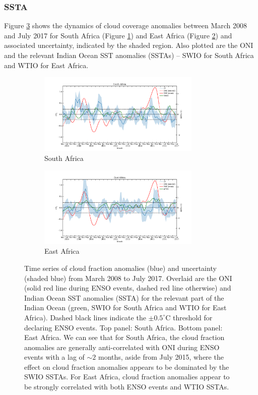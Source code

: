 \subsubsection{SSTA}
Figure \ref{fig:cf_temporal} shows the dynamics of cloud coverage
anomalies between March 2008 and July 2017 for South Africa (Figure
\ref{fig:cf_t_south}) and East Africa (Figure \ref{fig:cf_t_east}) and
associated uncertainty, indicated by the shaded region. Also plotted
are the ONI and the relevant Indian Ocean SST anomalies (SSTAs) -- SWIO
for South Africa and WTIO for East Africa.
\begin{figure}
  \centering
  \begin{subfigure}{\textwidth}
    \centering
    \includegraphics[width=0.85\textwidth]{figures/cf_oni_io_capetown_5window_median}
    \caption{South Africa}
    \label{fig:cf_t_south}
  \end{subfigure}
  \begin{subfigure}{\textwidth}
    \centering
    \includegraphics[width=0.85\textwidth]{figures/cf_oni_io_eastafrica_5window_median}
    \caption{East Africa}
    \label{fig:cf_t_east}
    \end{subfigure}
  \caption{Time series of cloud fraction anomalies (blue) and
    uncertainty (shaded blue) from March 2008 to July 2017. Overlaid
    are the ONI (solid red line during ENSO events, dashed red line
    otherwise) and Indian Ocean SST anomalies (SSTA) for the relevant
    part of the Indian Ocean (green, SWIO for South Africa and WTIO
    for East Africa). Dashed black lines indicate the $\pm0.5^{\circ}$C
    threshold for declaring ENSO events. Top panel: South
    Africa. Bottom panel: East Africa. We can see that for South
    Africa, the cloud fraction anomalies are generally anti-correlated
    with ONI during ENSO events with a lag of ${\sim}2$ months, aside from
    July 2015, where the effect on cloud fraction anomalies appears to
    be dominated by the SWIO SSTAs. For East Africa, cloud fraction
    anomalies appear to be strongly correlated with both ENSO events
    and WTIO SSTAs.}
  \label{fig:cf_temporal}
\end{figure}

